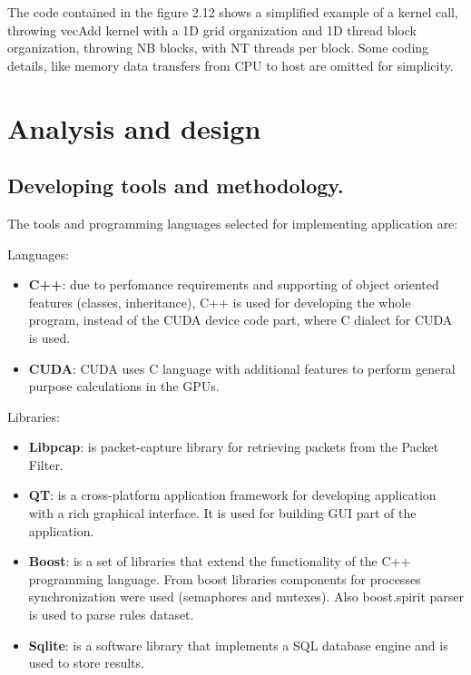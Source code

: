 \documentclass[thesis=M,english]{FITthesis}[2011/07/15]
\begin{document}
The code contained in the figure 2.12 shows a simplified example of a kernel call, throwing vecAdd kernel with a 1D grid organization and 1D thread block organization, throwing NB blocks, with NT threads per block. Some coding details, like memory data transfers from CPU to host are omitted for simplicity.


\chapter{Analysis and design}

\section{Developing tools and methodology.}
The tools and programming languages selected for implementing application are:

Languages:

\begin{itemize}
\item \textbf{C++}: due to perfomance requirements and supporting of object oriented features (classes, inheritance), C++ is used for developing the whole program, instead of the CUDA device code part, where C dialect for CUDA is used.
\item \textbf{CUDA}: CUDA uses C language with additional features to perform general purpose calculations in the GPUs.
\end{itemize}

Libraries:

\begin{itemize}
\item \textbf{Libpcap}: is packet-capture library for retrieving packets from the Packet Filter.
\item \textbf{QT}: is a cross-platform application framework for developing application with a rich graphical interface. It is used for building GUI part of the application.
\item \textbf{Boost}: is a set of libraries that extend the functionality of the C++ programming language. From boost libraries components for processes synchronization were used (semaphores and mutexes). Also boost.spirit parser is used to parse rules dataset.
\item \textbf{Sqlite}: is a software library that implements a SQL database engine and is used to store results.
\end{itemize}
\end{document}
